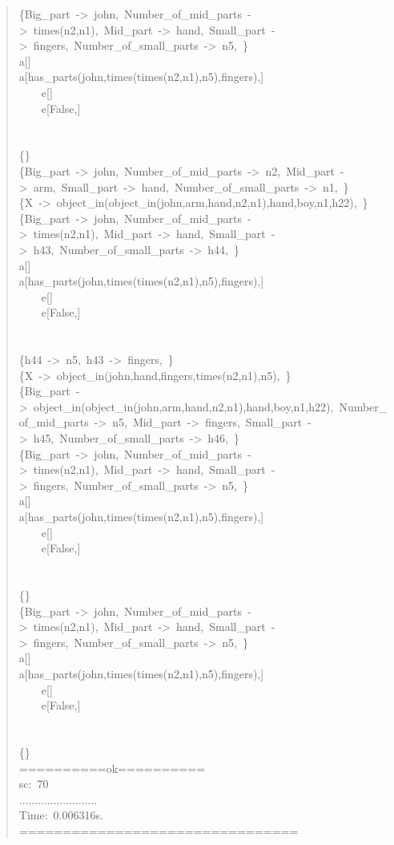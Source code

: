 \begin{quote}
\{Big\_part~->~john,~Number\_of\_mid\_parts~->~times(n2,n1),~Mid\_part~->~hand,~Small\_part~->~fingers,~Number\_of\_small\_parts~->~n5,~\}\\
a[]\\
a[has\_parts(john,times(times(n2,n1),n5),fingers),]\\
~~~~e[]\\
~~~~e[False,]\\
~\\
~\\
\{\}\\
\{Big\_part~->~john,~Number\_of\_mid\_parts~->~n2,~Mid\_part~->~arm,~Small\_part~->~hand,~Number\_of\_small\_parts~->~n1,~\}\\
\{X~->~object\_in(object\_in(john,arm,hand,n2,n1),hand,boy,n1,h22),~\}\\
\{Big\_part~->~john,~Number\_of\_mid\_parts~->~times(n2,n1),~Mid\_part~->~hand,~Small\_part~->~h43,~Number\_of\_small\_parts~->~h44,~\}\\
a[]\\
a[has\_parts(john,times(times(n2,n1),n5),fingers),]\\
~~~~e[]\\
~~~~e[False,]\\
~\\
~\\
\{h44~->~n5,~h43~->~fingers,~\}\\
\{X~->~object\_in(john,hand,fingers,times(n2,n1),n5),~\}\\
\{Big\_part~->~object\_in(object\_in(john,arm,hand,n2,n1),hand,boy,n1,h22),~Number\_of\_mid\_parts~->~n5,~Mid\_part~->~fingers,~Small\_part~->~h45,~Number\_of\_small\_parts~->~h46,~\}\\
\{Big\_part~->~john,~Number\_of\_mid\_parts~->~times(n2,n1),~Mid\_part~->~hand,~Small\_part~->~fingers,~Number\_of\_small\_parts~->~n5,~\}\\
a[]\\
a[has\_parts(john,times(times(n2,n1),n5),fingers),]\\
~~~~e[]\\
~~~~e[False,]\\
~\\
~\\
\{\}\\
\{Big\_part~->~john,~Number\_of\_mid\_parts~->~times(n2,n1),~Mid\_part~->~hand,~Small\_part~->~fingers,~Number\_of\_small\_parts~->~n5,~\}\\
a[]\\
a[has\_parts(john,times(times(n2,n1),n5),fingers),]\\
~~~~e[]\\
~~~~e[False,]\\
~\\
~\\
\{\}\\
==========ok==========\\
sc:~70\\
.........................\\
Time:~0.006316s.\\
================================
\end{quote}




